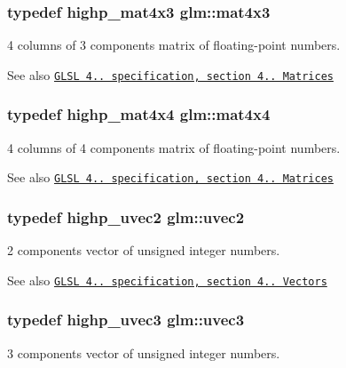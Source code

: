 \subsubsection[{\texorpdfstring{mat4x3}{mat4x3}}]{\setlength{\rightskip}{0pt plus 5cm}typedef highp\+\_\+mat4x3 {\bf glm\+::mat4x3}}\hypertarget{group__core__types_gad3f3f750dcdc74a9037342c5cae55f5e}{}\label{group__core__types_gad3f3f750dcdc74a9037342c5cae55f5e}
4 columns of 3 components matrix of floating-\/point numbers.

\begin{DoxySeeAlso}{See also}
\href{http://www.opengl.org/registry/doc/GLSLangSpec.4.20.8.pdf}{\tt G\+L\+SL 4.. specification, section 4.. Matrices} 
\end{DoxySeeAlso}
\subsubsection[{\texorpdfstring{mat4x4}{mat4x4}}]{\setlength{\rightskip}{0pt plus 5cm}typedef highp\+\_\+mat4x4 {\bf glm\+::mat4x4}}\hypertarget{group__core__types_ga63e3ee9447ed593484140a9368e738ec}{}\label{group__core__types_ga63e3ee9447ed593484140a9368e738ec}
4 columns of 4 components matrix of floating-\/point numbers.

\begin{DoxySeeAlso}{See also}
\href{http://www.opengl.org/registry/doc/GLSLangSpec.4.20.8.pdf}{\tt G\+L\+SL 4.. specification, section 4.. Matrices} 
\end{DoxySeeAlso}
\subsubsection[{\texorpdfstring{uvec2}{uvec2}}]{\setlength{\rightskip}{0pt plus 5cm}typedef highp\+\_\+uvec2 {\bf glm\+::uvec2}}\hypertarget{group__core__types_gafd2041b45eff671aa8899d2c2835eee9}{}\label{group__core__types_gafd2041b45eff671aa8899d2c2835eee9}
2 components vector of unsigned integer numbers.

\begin{DoxySeeAlso}{See also}
\href{http://www.opengl.org/registry/doc/GLSLangSpec.4.20.8.pdf}{\tt G\+L\+SL 4.. specification, section 4.. Vectors} 
\end{DoxySeeAlso}
\subsubsection[{\texorpdfstring{uvec3}{uvec3}}]{\setlength{\rightskip}{0pt plus 5cm}typedef highp\+\_\+uvec3 {\bf glm\+::uvec3}}\hypertarget{group__core__types_gac4ba593917841b859ba1683b8b52b8fa}{}\label{group__core__types_gac4ba593917841b859ba1683b8b52b8fa}
3 components vector of unsigned integer numbers.

